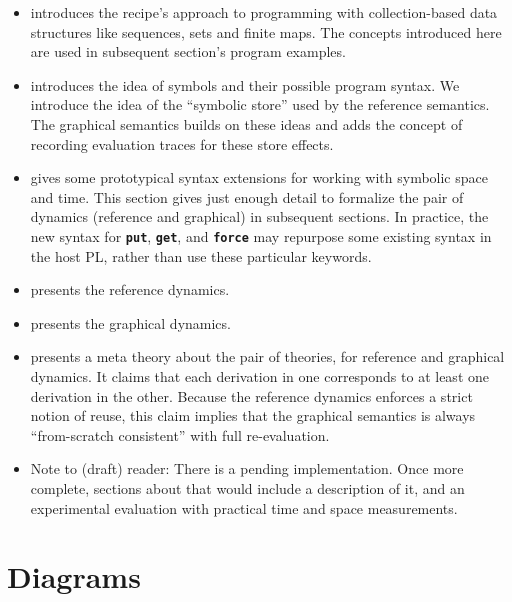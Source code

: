\documentclass[11pt]{article}
\renewcommand{\ottkw}[1]{\textbf{\texttt{#1}}}
\begin{document}
\begin{itemize}

\item {} introduces the recipe's approach to programming with collection-based data structures like sequences, sets and finite maps.  The concepts introduced here are used in subsequent section's program examples.

\item {} introduces the idea of symbols and their possible program syntax.  We introduce the idea of the ``symbolic store'' used by the reference semantics.  The graphical semantics builds on these ideas and adds the concept of recording evaluation traces for these store effects.

\item {} gives some prototypical syntax
  extensions for working with symbolic space and time.
  This section gives just enough detail to
  formalize the pair of dynamics (reference and graphical) in
  subsequent sections.
  In practice,
  the new syntax for \ottkw{put}, \ottkw{get}, and \ottkw{force} may
  repurpose some existing syntax in the host PL, rather than use these
  particular keywords.

\item {} presents the reference dynamics.

\item {} presents the graphical dynamics.

\item {} presents a meta theory
  about the pair of theories, for reference and graphical dynamics.
  It claims that each derivation in one corresponds
  to at least one derivation in the other.  Because the reference
  dynamics enforces a strict notion of reuse, this claim implies that
  the graphical semantics is always ``from-scratch consistent'' with
  full re-evaluation.

\item Note to (draft) reader: There is a pending implementation.  Once more
  complete, sections about that would include a description of it, and
  an experimental evaluation with practical time and space
  measurements.

\end{itemize}

\newpage

\section{Diagrams}
\end{document}
